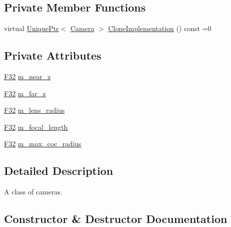 \subsection*{Private Member Functions}
\begin{DoxyCompactItemize}
\item 
virtual \hyperlink{namespacemage_a3316d7143a973e37adf1110f2e80ca31}{Unique\+Ptr}$<$ \hyperlink{classmage_1_1_camera}{Camera} $>$ \hyperlink{classmage_1_1_camera_aedf6e7d6ee6c6e9e82da814ef8e705ab}{Clone\+Implementation} () const =0
\end{DoxyCompactItemize}
\subsection*{Private Attributes}
\begin{DoxyCompactItemize}
\item 
\hyperlink{namespacemage_aa97e833b45f06d60a0a9c4fc22ae02c0}{F32} \hyperlink{classmage_1_1_camera_a8ae2c8fbe94cb6f8c4cd4a2811900b83}{m\+\_\+near\+\_\+z}
\item 
\hyperlink{namespacemage_aa97e833b45f06d60a0a9c4fc22ae02c0}{F32} \hyperlink{classmage_1_1_camera_a1073445c77b3224cd62613ae83853fe3}{m\+\_\+far\+\_\+z}
\item 
\hyperlink{namespacemage_aa97e833b45f06d60a0a9c4fc22ae02c0}{F32} \hyperlink{classmage_1_1_camera_a289dcf02aaa00853aba15189b47cd6d9}{m\+\_\+lens\+\_\+radius}
\item 
\hyperlink{namespacemage_aa97e833b45f06d60a0a9c4fc22ae02c0}{F32} \hyperlink{classmage_1_1_camera_a53b5a143e193bb11bf02e29543016cc3}{m\+\_\+focal\+\_\+length}
\item 
\hyperlink{namespacemage_aa97e833b45f06d60a0a9c4fc22ae02c0}{F32} \hyperlink{classmage_1_1_camera_af22ec34b0391c1c9a146cdae6e98dd15}{m\+\_\+max\+\_\+coc\+\_\+radius}
\end{DoxyCompactItemize}


\subsection{Detailed Description}
A class of cameras. 

\subsection{Constructor \& Destructor Documentation}
\hypertarget{classmage_1_1_camera_aa4718c93578d160299bdc24039cc256f}{}\label{classmage_1_1_camera_aa4718c93578d160299bdc24039cc256f} 
